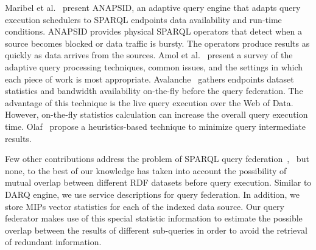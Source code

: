 \documentclass{sig-alternate}  %
\begin{document}
Maribel et al.~\cite{key-21} present ANAPSID, an adaptive query engine
that adapts query execution schedulers to SPARQL endpoints data
availability and run-time conditions. ANAPSID provides physical SPARQL
operators that detect when a source becomes blocked or data traffic
is bursty. The operators produce results as
quickly as data arrives from the sources. Amol et al.~\cite{key-17} present a survey of the adaptive query processing
techniques, common issues, and the settings in which each piece of work is most appropriate. 
Avalanche~\cite{key-24} gathers endpoints dataset statistics and bandwidth availability on-the-fly before the query federation. The advantage of this technique is the live query execution over the Web of Data. However, on-the-fly statistics calculation can increase the overall query execution time. Olaf~\cite{key-25} propose a heuristics-based technique to minimize query intermediate
results. 


Few other contributions address the problem of SPARQL query federation~\cite{key-22},~\cite{key-23} but none, to the best of our knowledge has taken into account the possibility of mutual overlap between different RDF datasets before query execution. Similar to DARQ engine, we use service
descriptions for query federation. In addition, we store MIPs vector
statistics for each of the indexed data source. Our query federator makes
use of this special statistic information to estimate the possible
overlap between the results of different sub-queries in order to avoid the retrieval of redundant information.
\end{document}
